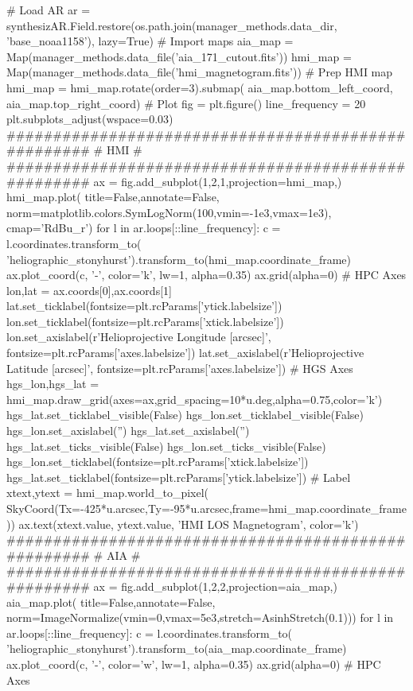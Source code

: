 \begin{pycode}
# Load AR
ar = synthesizAR.Field.restore(os.path.join(manager_methods.data_dir, 'base_noaa1158'), lazy=True)
# Import maps
aia_map = Map(manager_methods.data_file('aia_171_cutout.fits'))
hmi_map = Map(manager_methods.data_file('hmi_magnetogram.fits'))
# Prep HMI map
hmi_map = hmi_map.rotate(order=3).submap(
    aia_map.bottom_left_coord, aia_map.top_right_coord)
# Plot
fig = plt.figure()
line_frequency = 20
plt.subplots_adjust(wspace=0.03)
####################################################
#                       HMI                        #
####################################################
ax = fig.add_subplot(1,2,1,projection=hmi_map,)
hmi_map.plot(
    title=False,annotate=False,
    norm=matplotlib.colors.SymLogNorm(100,vmin=-1e3,vmax=1e3),
    cmap='RdBu_r')
for l in ar.loops[::line_frequency]:
    c = l.coordinates.transform_to(
            'heliographic_stonyhurst').transform_to(hmi_map.coordinate_frame)
    ax.plot_coord(c, '-', color='k', lw=1, alpha=0.35)
ax.grid(alpha=0)
# HPC Axes
lon,lat = ax.coords[0],ax.coords[1]
lat.set_ticklabel(fontsize=plt.rcParams['ytick.labelsize'])
lon.set_ticklabel(fontsize=plt.rcParams['xtick.labelsize'])
lon.set_axislabel(r'Helioprojective Longitude [arcsec]', fontsize=plt.rcParams['axes.labelsize'])
lat.set_axislabel(r'Helioprojective Latitude [arcsec]', fontsize=plt.rcParams['axes.labelsize'])
# HGS Axes
hgs_lon,hgs_lat = hmi_map.draw_grid(axes=ax,grid_spacing=10*u.deg,alpha=0.75,color='k')
hgs_lat.set_ticklabel_visible(False)
hgs_lon.set_ticklabel_visible(False)
hgs_lon.set_axislabel('')
hgs_lat.set_axislabel('')
hgs_lat.set_ticks_visible(False)
hgs_lon.set_ticks_visible(False)
hgs_lon.set_ticklabel(fontsize=plt.rcParams['xtick.labelsize'])
hgs_lat.set_ticklabel(fontsize=plt.rcParams['ytick.labelsize'])
# Label
xtext,ytext = hmi_map.world_to_pixel(
    SkyCoord(Tx=-425*u.arcsec,Ty=-95*u.arcsec,frame=hmi_map.coordinate_frame))
ax.text(xtext.value, ytext.value, 'HMI LOS Magnetogram', color='k')
####################################################
#                       AIA                        #
####################################################
ax = fig.add_subplot(1,2,2,projection=aia_map,)
aia_map.plot(
    title=False,annotate=False,
    norm=ImageNormalize(vmin=0,vmax=5e3,stretch=AsinhStretch(0.1)))
for l in ar.loops[::line_frequency]:
    c = l.coordinates.transform_to(
            'heliographic_stonyhurst').transform_to(aia_map.coordinate_frame)
    ax.plot_coord(c, '-', color='w', lw=1, alpha=0.35)
ax.grid(alpha=0)
# HPC Axes

\end{pycode}
